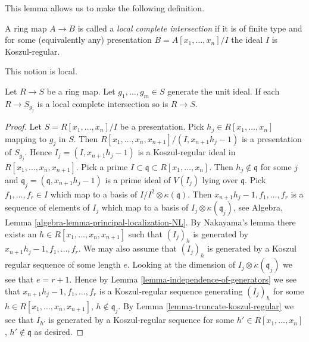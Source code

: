 \noindent
This lemma allows us to make the following definition.

\begin{definition}
\label{definition-local-complete-intersection}
A ring map $A \to B$ is called a {\it local complete intersection}
if it is of finite type and for some (equivalently any) presentation
$B = A[x_1, \ldots, x_n]/I$ the ideal $I$ is Koszul-regular.
\end{definition}

\noindent
This notion is local.

\begin{lemma}
\label{lemma-lci-local}
Let $R \to S$ be a ring map. Let $g_1, \ldots, g_m \in S$
generate the unit ideal. If each $R \to S_{g_j}$ is a local
complete intersection so is $R \to S$.
\end{lemma}

\begin{proof}
Let $S = R[x_1, \ldots, x_n]/I$ be a presentation. Pick
$h_j \in R[x_1, \ldots, x_n]$ mapping to $g_j$ in $S$.
Then $R[x_1, \ldots, x_n, x_{n + 1}]/(I, x_{n + 1}h_j - 1)$
is a presentation of $S_{g_j}$. Hence
$I_j = (I, x_{n + 1}h_j - 1)$ is a Koszul-regular ideal in
$R[x_1, \ldots, x_n, x_{n + 1}]$. Pick a prime
$I \subset \mathfrak q \subset R[x_1, \ldots, x_n]$.
Then $h_j \not \in \mathfrak q$ for some $j$ and
$\mathfrak q_j = (\mathfrak q, x_{n + 1}h_j - 1)$ is a prime
ideal of $V(I_j)$ lying over $\mathfrak q$.
Pick $f_1, \ldots, f_r \in I$ which map to a basis of
$I/I^2 \otimes \kappa(\mathfrak q)$. Then
$x_{n + 1}h_j - 1, f_1, \ldots, f_r$ is a sequence of elements of $I_j$
which map to a basis of $I_j \otimes \kappa(\mathfrak q_j)$, see
Algebra, Lemma \ref{algebra-lemma-principal-localization-NL}.
By Nakayama's lemma there exists an $h \in R[x_1, \ldots, x_n, x_{n + 1}]$
such that $(I_j)_h$ is generated by $x_{n + 1}h_j - 1, f_1, \ldots, f_r$.
We may also assume that $(I_j)_h$ is generated by a Koszul regular
sequence of some length $e$. Looking at the dimension of
$I_j \otimes \kappa(\mathfrak q_j)$ we see that $e = r + 1$.
Hence by
Lemma \ref{lemma-independence-of-generators}
we see that $x_{n + 1}h_j - 1, f_1, \ldots, f_r$ is a
Koszul-regular sequence generating $(I_j)_h$ for some
$h \in R[x_1, \ldots, x_n, x_{n + 1}]$, $h \not \in \mathfrak q_j$. By
Lemma \ref{lemma-truncate-koszul-regular}
we see that $I_{h'}$ is generated by a Koszul-regular sequence for some
$h' \in R[x_1, \ldots, x_n]$, $h' \not \in \mathfrak q$ as desired.
\end{proof}

